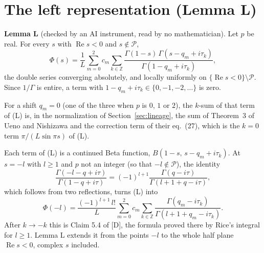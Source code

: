 \documentclass[11pt]{article}
\newcommand{\re}{\operatorname{Re}}
\begin{document}
\section{The left representation (Lemma L)}\label{sec:L}

\noindent\textbf{Lemma L} (checked by an AI instrument, read by no mathematician). Let $p$ be real. For every $s$ with $\re s<0$ and $s\notin\mathcal{P}$,
\begin{equation*}
\Phi(s)=\frac1L\sum_{m=0}^{2}c_m\sum_{k\in\mathbb{Z}}\frac{\Gamma(1-s)\,\Gamma(s-q_m+i\tau_k)}{\Gamma(1-q_m+i\tau_k)}, \tag{L}
\end{equation*}
the double series converging absolutely, and locally uniformly on $\{\re s<0\}\setminus\mathcal{P}$. Since $1/\Gamma$ is entire, a term with $1-q_m+i\tau_k\in\{0,-1,-2,\dots\}$ is zero.

\medskip
For a shift $q_m=0$ (one of the three when $p$ is $0$, $1$ or $2$), the $k$-sum of that term of (L) is, in the normalization of Section~\ref{sec:lineage}, the sum of Theorem~3 of Ueno and Nishizawa \cite[eq.~(32), at $z=1$]{UN} and the correction term of their eq.~(27), which is the $k=0$ term $\pi/(L\sin\pi s)$ of (L).

\medskip
Each term of (L) is a continued Beta function, $B(1-s,\,s-q_m+i\tau_k)$. At $s=-l$ with $l\ge1$ and $p$ not an integer (so that $-l\notin\mathcal{P}$), the identity
\[
\frac{\Gamma(-l-q+i\tau)}{\Gamma(1-q+i\tau)}=(-1)^{l+1}\frac{\Gamma(q-i\tau)}{\Gamma(l+1+q-i\tau)},
\]
which follows from two reflections, turns (L) into
\[
\Phi(-l)=\frac{(-1)^{l+1}\,l!}{L}\sum_{m=0}^{2}c_m\sum_{k\in\mathbb{Z}}\frac{\Gamma(q_m-i\tau_k)}{\Gamma(l+1+q_m-i\tau_k)}.
\]
After $k\to-k$ this is Claim 5.4 of [D], the formula proved there by Rice's integral for $l\ge1$. Lemma L extends it from the points $-l$ to the whole half plane $\re s<0$, complex $s$ included.
\end{document}

